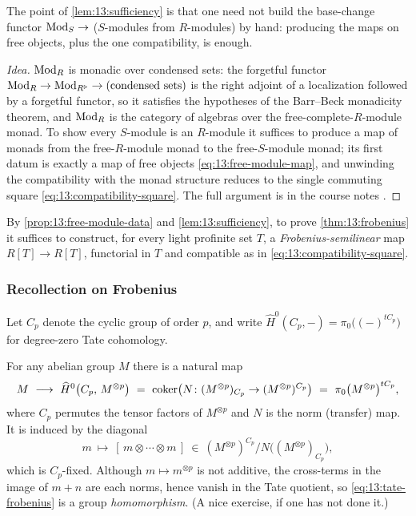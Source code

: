 The point of \cref{lem:13:sufficiency} is that one need not build the base-change
functor $\operatorname{Mod}_S\to$ ($S$-modules from $R$-modules) by hand: producing the maps on
free objects, plus the one compatibility, is enough.

\begin{proof}[Idea]
$\operatorname{Mod}_R$ is monadic over condensed sets: the forgetful functor
$\operatorname{Mod}_R\to\operatorname{Mod}_{R^{\triangleright}}\to(\text{condensed sets})$ is the right adjoint of a
localization followed by a forgetful functor, so it satisfies the hypotheses of
the Barr--Beck monadicity theorem, and $\operatorname{Mod}_R$ is the category of algebras over
the free-complete-$R$-module monad. To show every $S$-module is an $R$-module it
suffices to produce a map of monads from the free-$R$-module monad to the
free-$S$-module monad; its first datum is exactly a map of free objects
\eqref{eq:13:free-module-map}, and unwinding the compatibility with the monad
structure reduces to the single commuting square
\eqref{eq:13:compatibility-square}. The full argument is in the course notes
\cite{scholze2020analytic}.
\end{proof}

By \cref{prop:13:free-module-data} and \cref{lem:13:sufficiency}, to prove
\cref{thm:13:frobenius} it suffices to construct, for every light profinite set
$T$, a \emph{Frobenius-semilinear} map $R[T]\to R[T]$, functorial in $T$ and
compatible as in \eqref{eq:13:compatibility-square}.

\subsubsection*{Recollection on Frobenius}

Let $C_p$ denote the cyclic group of order $p$, and write
$\widehat H^{0}(C_p,-)=\pi_0\big((-)^{tC_p}\big)$ for degree-zero Tate cohomology.

\begin{recollection}
\label{rec:13:frobenius}
For any abelian group $M$ there is a natural map
\begin{equation}
\label{eq:13:tate-frobenius}
M\ \longrightarrow\ \widehat H^{0}\big(C_p,\,M^{\otimes p}\big)\ =\ \coker\!\big(N\colon (M^{\otimes p})_{C_p}\to (M^{\otimes p})^{C_p}\big)\ =\ \pi_0\big(M^{\otimes p}\big)^{tC_p},
\end{equation}
where $C_p$ permutes the tensor factors of $M^{\otimes p}$ and $N$ is the norm
(transfer) map. It is induced by the diagonal
\begin{equation*}
m\ \longmapsto\ [\,m\otimes\cdots\otimes m\,]\ \in\ (M^{\otimes p})^{C_p}\big/N\big((M^{\otimes p})_{C_p}\big),
\end{equation*}
which is $C_p$-fixed. Although $m\mapsto m^{\otimes p}$ is not additive, the
cross-terms in the image of $m+n$ are each norms, hence vanish in the Tate
quotient, so \eqref{eq:13:tate-frobenius} is a group \emph{homomorphism}. (A nice
exercise, if one has not done it.)
\end{recollection}


